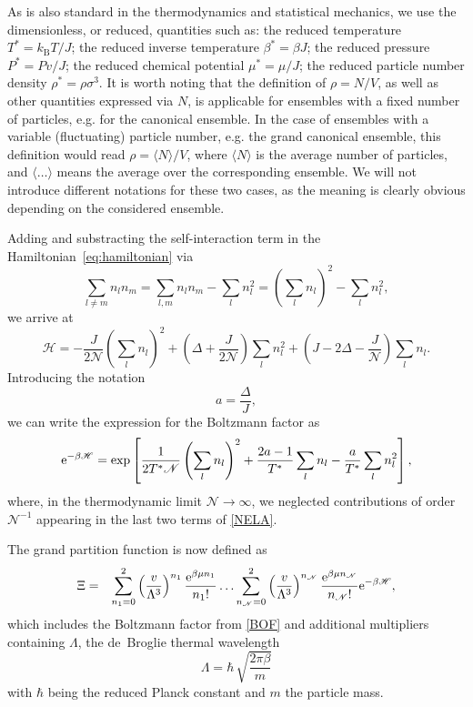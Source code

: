 \documentclass[pdflatex,sn-mathphys-num]{sn-jnl}%
\theoremstyle{thmstyleone}%
\theoremstyle{thmstyletwo}%
\theoremstyle{thmstylethree}%
\begin{document}
	As is also standard in the thermodynamics and statistical mechanics, we use the dimensionless, or reduced, quantities such as: the reduced temperature $T^* = k_{\mathrm B}T/J$; the reduced inverse temperature $\beta^* = \beta J$; the reduced pressure $P^* = Pv/J$; the reduced chemical potential $\mu^* = \mu/J$; the reduced particle number density $\rho^* = \rho \sigma^3$. It is worth noting that the definition of $\rho = N/V$, as well as other quantities expressed via $N$, is applicable for ensembles with a fixed number of particles, e.g. for the canonical ensemble. In the case of ensembles with a variable (fluctuating) particle number, e.g. the grand canonical ensemble, this definition would read $\rho = \langle N \rangle / V$, where $\langle N \rangle$ is the average number of particles, and $\langle \ldots \rangle$ means the average over the corresponding ensemble. We will not introduce different notations for these two cases, as the meaning is clearly obvious depending on the considered ensemble.
	
	Adding and substracting the self-interaction term in the Hamiltonian~\eqref{eq:hamiltonian} via
	\begin{equation}
		\sum_{l\neq m} n_l n_m = \sum_{l,m} n_l n_m - \sum_l n_l^2 = \left(\sum_l n_l\right)^2 - \sum_l n_l^2,
	\end{equation}
	we arrive at
	\begin{equation}\label{NELA}
		\mathscr{H} = -\frac{J}{2\mathscr{N}} \left(\sum_l n_l\right)^2  + \left(\Delta + \frac{J}{2\mathscr{N}}\right) \sum_l n_l^2 + \left(J -2\Delta - \frac{J}{\mathscr{N}}\right) \sum_l n_l.
	\end{equation}
	Introducing the notation
	\begin{equation}
		a = \frac{\Delta}{J},
	\end{equation}
	we can write the expression for the Boltzmann factor as
	\begin{equation}\label{BOF}
		{\rm e}^{-\beta \mathscr{H}} = \exp \left[\frac{1}{2T^* \mathscr{N}} \left(\sum_l n_l\right)^2 + \frac{2a-1}{T^*} \sum_l n_l - \frac{a}{T^*} \sum_l n_l^2\right],
	\end{equation}
	where, in the thermodynamic limit $\mathscr{N}\to\infty$, we neglected contributions of order $\mathscr{N}^{-1}$ appearing in the last two terms of \eqref{NELA}.
	
	The grand partition function is now defined as
	\begin{eqnarray}
		\label{eq:Xi_pi}
		\Xi & = & \sum_{n_1 = 0}^2 \left(\frac{v}{\Lambda^3}\right)^{n_1} \frac{{\rm e}^{\beta\mu n_1}}{n_1!} \ldots \sum_{n_{\mathscr{N}} = 0}^2 \left(\frac{v}{\Lambda^3}\right)^{n_{\mathscr{N}}} \frac{{\rm e}^{\beta\mu n_{\mathscr{N}}}}{n_{\mathscr{N}}!} {\rm e}^{-\beta\mathscr{H}} ,
	\end{eqnarray}
	which includes the Boltzmann factor from \eqref{BOF} and additional multipliers containing $\Lambda$, the de~Broglie thermal wavelength
	\begin{equation}\label{Lam}
		\Lambda=\hbar\,\sqrt{\frac{2\pi\beta}m}
	\end{equation}
	with $\hbar$ being the reduced Planck constant and $m$ the particle mass.
	
\end{document}

